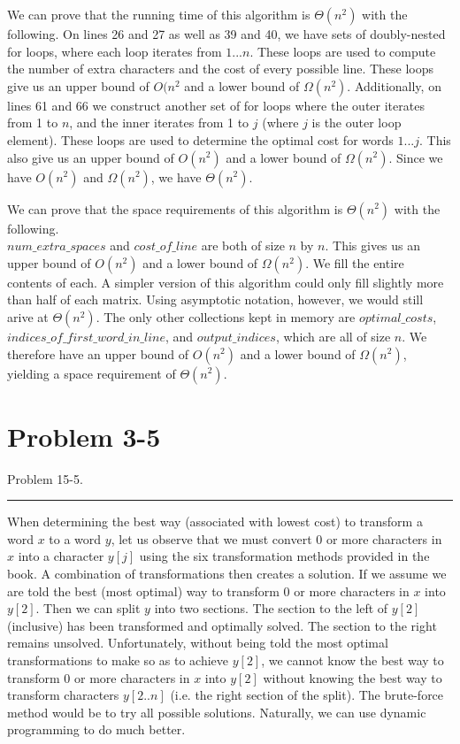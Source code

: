 \documentclass[11pt]{article}
\def\separateline{\medskip\hrule\medskip}
\begin{document}
We can prove that the running time of this algorithm is $\Theta(n^2)$ with the following. On lines 26 and 27 as well as 39 and 40, we have sets of doubly-nested for loops, where each loop iterates from $1...n$. These loops are used to compute the number of extra characters and the cost of every possible line. These loops give us an upper bound of $O(n^2$ and a lower bound of $\Omega(n^2)$. Additionally, on lines 61 and 66 we construct another set of for loops where the outer iterates from 1 to $n$, and the inner iterates from 1 to $j$ (where $j$ is the outer loop element). These loops are used to determine the optimal cost for words $1...j$. This also give us an upper bound of $O(n^2)$ and a lower bound of $\Omega(n^2)$. Since we have $O(n^2)$ and $\Omega(n^2)$, we have $\Theta(n^2)$.

We can prove that the space requirements of this algorithm is $\Theta(n^2)$ with the following. \\$num\_extra\_spaces$ and $cost\_of\_line$ are both of size $n$ by $n$. This gives us an upper bound of $O(n^2)$ and a lower bound of $\Omega(n^2)$. We fill the entire contents of each. A simpler version of this algorithm could only fill slightly more than half of each matrix. Using asymptotic notation, however, we would still arive at $\Theta(n^2)$. The only other collections kept in memory are $optimal\_costs$, $indices\_of\_first\_word\_in\_line$, and $output\_indices$, which are all of size $n$. We therefore have an upper bound of $O(n^2)$ and a lower bound of $\Omega(n^2)$, yielding a space requirement of $\Theta(n^2)$.

\newpage

\section{Problem 3-5}
Problem 15-5.
\separateline

When determining the best way (associated with lowest cost) to transform a word $x$ to a word $y$, let us observe that we must convert 0 or more characters in $x$ into a character $y[j]$ using the six transformation methods provided in the book. A combination of transformations then creates a solution. If we assume we are told the best (most optimal) way to transform 0 or more characters in $x$ into $y[2]$. Then we can split $y$ into two sections. The section to the left of $y[2]$ (inclusive) has been transformed and optimally solved. The section to the right remains unsolved. Unfortunately, without being told the most optimal transformations to make so as to achieve $y[2]$, we cannot know the best way to transform 0 or more characters in $x$ into $y[2]$ without knowing the best way to transform characters $y[2..n]$ (i.e. the right section of the split). The brute-force method would be to try all possible solutions. Naturally, we can use dynamic programming to do much better.
\end{document}
